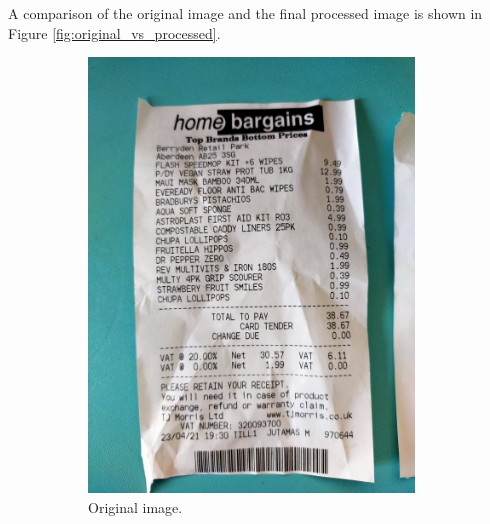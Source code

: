 \documentclass[
  printed, %
  table,   %
  oneside, %
  lof,     %
  lot,     %
]{fithesis3}
\newcommand\half{0.45}
\newcommand\subfigsize{0.95}
\begin{document}
    A comparison of the original image and the final processed image is shown in Figure \ref{fig:original_vs_processed}.
    
    \begin{figure}[H]
        \centering
        \begin{subfigure}[t]{\half\textwidth}
          \centering
          \includegraphics[width=\subfigsize\textwidth]{figures/image_processing/original_image}
          \caption{Original image.}
        \end{subfigure}
        \begin{subfigure}[t]{\half\textwidth}
          \centering

\end{subfigure}
\end{figure}
\end{document}
